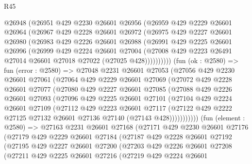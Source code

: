 \begin{lexlean}{R45}
\begin{coremodule}
      @26948
      (@26951
        @429
        @2230
        @26601
        @26956
        (@26959
          @429
          @2229
          @26601
          @26964
          (@26967
            @429
            @2228
            @26601
            @26972
            (@26975
              @429
              @2227
              @26601
              @26980
              (@26983
                @429
                @2226
                @26601
                @26988
                (@26991
                  @429
                  @2225
                  @26601
                  @26996
                  (@26999
                    @429
                    @2224
                    @26601
                    @27004
                    (@27008 @429 @2223 @26491 @27014 @26601 @27018 @27022 (@27025 @428))))))))))
    (fun (ok : @2580) =>
    fun (error : @2580) =>
    @27048
      @2231
      @26601
      @27053
      (@27056
        @429
        @2230
        @26601
        @27061
        (@27064
          @429
          @2229
          @26601
          @27069
          (@27072
            @429
            @2228
            @26601
            @27077
            (@27080
              @429
              @2227
              @26601
              @27085
              (@27088
                @429
                @2226
                @26601
                @27093
                (@27096
                  @429
                  @2225
                  @26601
                  @27101
                  (@27104
                    @429
                    @2224
                    @26601
                    @27109
                    (@27112
                      @429
                      @2223
                      @26601
                      @27117
                      (@27122 @429 @2222 @27125 @27132 @26601 @27136 @27140 (@27143 @428)))))))))))
    (fun (element : @2580) =>
    @27163
      @2231
      @26601
      @27168
      (@27171
        @429
        @2230
        @26601
        @27176
        (@27179
          @429
          @2229
          @26601
          @27184
          (@27187
            @429
            @2228
            @26601
            @27192
            (@27195
              @429
              @2227
              @26601
              @27200
              (@27203
                @429
                @2226
                @26601
                @27208
                (@27211
                  @429
                  @2225
                  @26601
                  @27216
                  (@27219
                    @429
                    @2224
                    @26601

\end{coremodule}
\end{lexlean}

